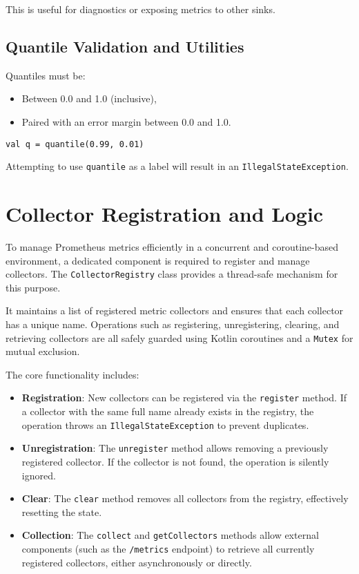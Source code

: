 This is useful for diagnostics or exposing metrics to other sinks.

\subsection{Quantile Validation and Utilities}

Quantiles must be:
\begin{itemize}
\item Between 0.0 and 1.0 (inclusive),
\item Paired with an error margin between 0.0 and 1.0.
\end{itemize}

\begin{verbatim}
val q = quantile(0.99, 0.01)
\end{verbatim}

Attempting to use \texttt{quantile} as a label will result in an \texttt{IllegalStateException}.


\section{Collector Registration and Logic}

To manage Prometheus metrics efficiently in a concurrent and coroutine-based environment, a dedicated component is required to register and manage collectors. The \texttt{CollectorRegistry} class provides a thread-safe mechanism for this purpose.

It maintains a list of registered metric collectors and ensures that each collector has a unique name. Operations such as registering, unregistering, clearing, and retrieving collectors are all safely guarded using Kotlin coroutines and a \texttt{Mutex} for mutual exclusion.

The core functionality includes:
\begin{itemize}
    \item \textbf{Registration}: New collectors can be registered via the \texttt{register} method. If a collector with the same full name already exists in the registry, the operation throws an \texttt{IllegalStateException} to prevent duplicates.
    
    \item \textbf{Unregistration}: The \texttt{unregister} method allows removing a previously registered collector. If the collector is not found, the operation is silently ignored.
    
    \item \textbf{Clear}: The \texttt{clear} method removes all collectors from the registry, effectively resetting the state.
    
    \item \textbf{Collection}: The \texttt{collect} and \texttt{getCollectors} methods allow external components (such as the \texttt{/metrics} endpoint) to retrieve all currently registered collectors, either asynchronously or directly.
\end{itemize}

